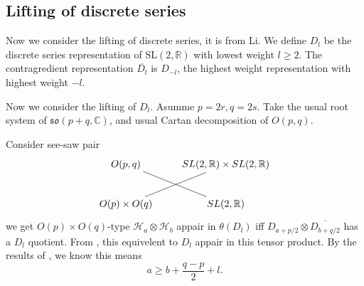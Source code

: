 \documentclass[12pt]{article}
\def\bR{{\mathbb{R}}}
\def\bC{{\mathbb{C}}}
\def\inn#1#2{\left\langle{#1},{#2}\right\rangle}
\def\SL{{\rm SL}}
\def\aso{\mathfrak{so}}
\def\fkk{\mathfrak{k}}
\def\chh{\mathcal{H}}
\def\SL{\mathrm{SL}}
\begin{document}






\subsection{Lifting of discrete series}


Now we consider the lifting of discrete series, it is from Li\cite{Li1990}.
We define $D_l$ be the discrete series representation of $\SL(2,\bR)$ with 
lowest weight $l\geq 2$. The contragredient representation $\overline{D_l}$ is 
$D_{-l}$, the highest weight representation with highest weight $-l$.

Now we consider the lifting of $D_{l}$.
Asumme $p=2r, q=2s$.
Take the usual root system of $\aso(p+q,\bC)$, and usual Cartan decomposition
of $O(p,q)$. 

Consider see-saw pair 
\[
\xymatrix{
O(p,q) \ar@{-}[dr]& SL(2,\bR)\times SL(2,\bR) \\
O(p)\times O(q)\ar@{-}[ur] & SL(2,\bR)}
\] 
we get $O(p)\times O(q)$-type
 $\chh_a\otimes \chh_b$ appair in $\theta(D_{l})$ 
iff $D_{a+p/2}\otimes \overline{D_{b+q/2}}$ has a $D_{l}$ quotient.
From \cite{Howe1979Opq},
this equivelent to $D_{l}$ appair in this tensor product. 
By the results of \cite{Repka1976tensor}, we know this means
\[
a \geq b + \frac{q-p}{2} + l.
\]
\end{document}
